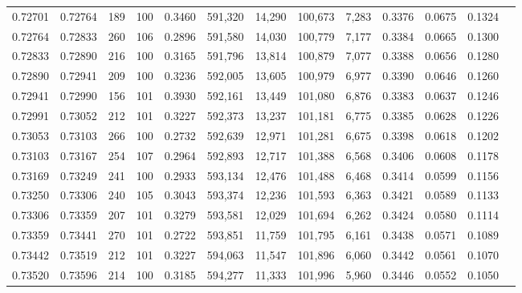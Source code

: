 \begin{tabular}{rrrrrrrrrrrrr}
0.72701 & 0.72764 &   189 & 100 &                                     0.3460 & 591,320 &  14,290 & 100,673 &   7,283 & 0.3376 & 0.0675 & 0.1324 \\
0.72764 & 0.72833 &   260 & 106 &                                     0.2896 & 591,580 &  14,030 & 100,779 &   7,177 & 0.3384 & 0.0665 & 0.1300 \\
0.72833 & 0.72890 &   216 & 100 &                                     0.3165 & 591,796 &  13,814 & 100,879 &   7,077 & 0.3388 & 0.0656 & 0.1280 \\
0.72890 & 0.72941 &   209 & 100 &                                     0.3236 & 592,005 &  13,605 & 100,979 &   6,977 & 0.3390 & 0.0646 & 0.1260 \\
0.72941 & 0.72990 &   156 & 101 &                                     0.3930 & 592,161 &  13,449 & 101,080 &   6,876 & 0.3383 & 0.0637 & 0.1246 \\
0.72991 & 0.73052 &   212 & 101 &                                     0.3227 & 592,373 &  13,237 & 101,181 &   6,775 & 0.3385 & 0.0628 & 0.1226 \\
0.73053 & 0.73103 &   266 & 100 &                                     0.2732 & 592,639 &  12,971 & 101,281 &   6,675 & 0.3398 & 0.0618 & 0.1202 \\
0.73103 & 0.73167 &   254 & 107 &                                     0.2964 & 592,893 &  12,717 & 101,388 &   6,568 & 0.3406 & 0.0608 & 0.1178 \\
0.73169 & 0.73249 &   241 & 100 &                                     0.2933 & 593,134 &  12,476 & 101,488 &   6,468 & 0.3414 & 0.0599 & 0.1156 \\
0.73250 & 0.73306 &   240 & 105 &                                     0.3043 & 593,374 &  12,236 & 101,593 &   6,363 & 0.3421 & 0.0589 & 0.1133 \\
0.73306 & 0.73359 &   207 & 101 &                                     0.3279 & 593,581 &  12,029 & 101,694 &   6,262 & 0.3424 & 0.0580 & 0.1114 \\
0.73359 & 0.73441 &   270 & 101 &                                     0.2722 & 593,851 &  11,759 & 101,795 &   6,161 & 0.3438 & 0.0571 & 0.1089 \\
0.73442 & 0.73519 &   212 & 101 &                                     0.3227 & 594,063 &  11,547 & 101,896 &   6,060 & 0.3442 & 0.0561 & 0.1070 \\
0.73520 & 0.73596 &   214 & 100 &                                     0.3185 & 594,277 &  11,333 & 101,996 &   5,960 & 0.3446 & 0.0552 & 0.1050 \\

\end{tabular}
